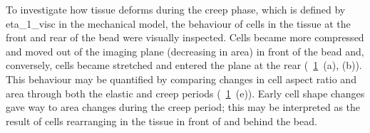 \begin{figure}
{ %
 }\label{fig:cell_tracking}
\end{figure}
To investigate how tissue deforms during the creep phase, which is defined by \gls{eta_1_visc} in the mechanical model, the behaviour of cells in the tissue at the front and rear of the bead were visually inspected.
Cells became more compressed and moved out of the imaging plane (decreasing in area) in front of the bead and, conversely, cells became stretched and entered  the plane at the rear (\figurename~\ref{fig:cell_tracking}~(a), (b)).
This behaviour may be quantified by comparing changes in cell aspect ratio and area through both the elastic and creep periods (\figurename~\ref{fig:cell_tracking}~(e)).
Early cell shape changes gave way to area changes during the creep period; this may be interpreted as the result of cells rearranging in the tissue in front of and behind the bead.


